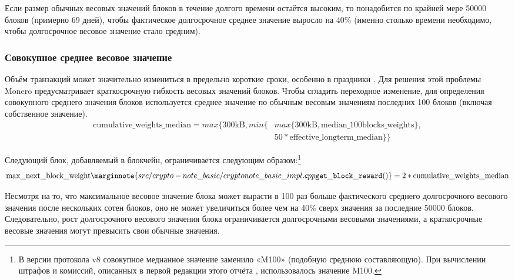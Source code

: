 Если размер обычных весовых значений блоков в течение долгого времени остаётся высоким, то понадобится по крайней мере 50000 блоков (примерно 69 дней), чтобы фактическое долго\-срочное среднее значение выросло на 40\% (именно столько времени необходимо, чтобы долго\-срочное весовое значение стало средним).

\subsubsection*{Совокупное среднее весовое значение}

Объём транзакций может значительно измениться в предельно короткие сроки, особенно в праздники \cite{visa-seasonality}. Для решения этой проблемы Monero предусматривает краткосрочную гибкость весовых значений блоков. Чтобы сгладить переходное изменение, для определения совокупного среднего значения блоков используется среднее значение по обычным весовым значениям последних 100 блоков (включая собственное значение).\vspace{.1cm}
\begin{align*}
    \textrm{cumulative\_weights\_median} = max\{\textrm{300kB}, min\{&max\{\textrm{300kB}, \textrm{median\_100blocks\_weights}\},\\
    &50*\textrm{effective\_longterm\_median}\}\}%
\end{align*}{}

Следующий блок, добавляемый в блокчейн, ограничивается следующим образом:\footnote{В версии протокола v8 совокупное медианное значение заменило «M100» (подобную среднюю составляющую). При вычислении штрафов и комиссий, описанных в первой редакции этого отчёта \cite{ztm-1}, использовалось значение M100.}\vspace{.1cm}
\[\textrm{max\_next\_block\_weight}\marginnote{src/crypto- note\_basic/ cryptonote\_ basic\_ impl.cpp {\tt get\_block\_ reward()}} = 2*\textrm{cumulative\_weights\_median}\]%

Несмотря на то, что максимальное весовое значение блока может вырасти в 100 раз больше фактического среднего долгосрочного весового значения после нескольких сотен блоков, оно не может увеличиться более чем на 40\% сверх значения за последние 50000 блоков. Следова\-тельно, рост долгосрочного весового значения блока ограничивается долгосрочными весовыми значениями, а краткосрочные весовые значения могут превысить свои обычные значения.


